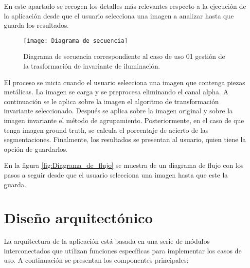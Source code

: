 En este apartado se recogen los detalles más relevantes respecto a la ejecución de la aplicación desde que el usuario selecciona una imagen a analizar hasta que guarda los resultados.

\begin{figure}[!h]
    \centering
    \texttt{[image: Diagrama\_de\_secuencia]}
    \caption{Diagrama de secuencia correspondiente al caso de uso 01 gestión de la trasformación de invariante de iluminación.}\label{fig:Diagrama_de_secuencia}
\end{figure}

El proceso se inicia cuando el usuario selecciona una imagen que contenga piezas metálicas. La imagen se carga y se preprocesa eliminando el canal alpha. A continuación se le aplica sobre la imagen el algoritmo de transformación invariante seleccionado. Después se aplica sobre la imagen original y sobre la imagen invariante el método de agrupamiento. Posteriormente, en el caso de que tenga imagen ground truth, se calcula el porcentaje de acierto de las segmentaciones. Finalmente, los resultados se presentan al usuario, quien tiene la opción de guardarlos.


En la figura \ref{fig:Diagrama_de_flujo} se muestra de un diagrama de flujo con los pasos a seguir desde que el usuario selecciona una imagen hasta que este la guarda.

\section{Diseño arquitectónico}\label{diseño-arquitectónico}

La arquitectura de la aplicación está basada en una serie de módulos interconectados que utilizan funciones específicas para implementar los casos de uso. A continuación se presentan los componentes principales:


